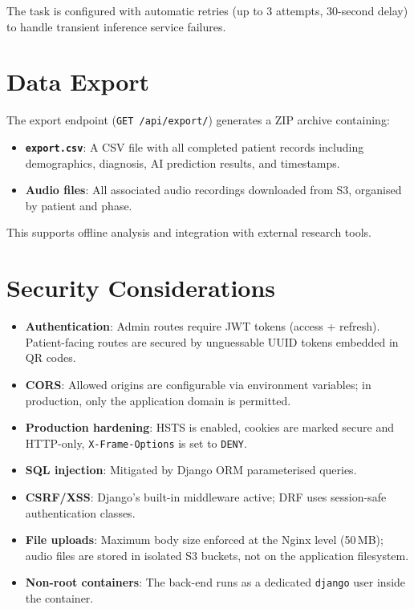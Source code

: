 \documentclass[12pt,a4paper]{article}
\begin{document}
The task is configured with automatic retries (up to 3 attempts, 30-second
delay) to handle transient inference service failures.

\section{Data Export}
\label{sec:export}

The export endpoint (\texttt{GET /api/export/}) generates a ZIP archive
containing:

\begin{itemize}[nosep]
  \item \textbf{\texttt{export.csv}}: A CSV file with all completed patient
    records including demographics, diagnosis, AI prediction results, and
    timestamps.
  \item \textbf{Audio files}: All associated audio recordings downloaded from
    S3, organised by patient and phase.
\end{itemize}

This supports offline analysis and integration with external research tools.

\section{Security Considerations}
\label{sec:security}

\begin{itemize}[nosep]
  \item \textbf{Authentication}: Admin routes require JWT tokens (access +
    refresh). Patient-facing routes are secured by unguessable UUID tokens
    embedded in QR codes.
  \item \textbf{CORS}: Allowed origins are configurable via environment
    variables; in production, only the application domain is permitted.
  \item \textbf{Production hardening}: HSTS is enabled, cookies are marked
    secure and HTTP-only, \texttt{X-Frame-Options} is set to \texttt{DENY}.
  \item \textbf{SQL injection}: Mitigated by Django ORM parameterised queries.
  \item \textbf{CSRF/XSS}: Django's built-in middleware active; DRF uses
    session-safe authentication classes.
  \item \textbf{File uploads}: Maximum body size enforced at the Nginx level
    (50\,MB); audio files are stored in isolated S3 buckets, not on the
    application filesystem.
  \item \textbf{Non-root containers}: The back-end runs as a dedicated
    \texttt{django} user inside the container.
\end{itemize}
\end{document}
